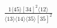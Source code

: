 \documentclass[varwidth, border=5pt]{standalone}
\begin{document}
\begin{my}
$\begin{gathered}
\scriptscriptstyle\frac{1⟨45⟩[34]^2⟨12⟩}{⟨13⟩⟨14⟩⟨35⟩[35]^2}
\end{gathered}$
\end{my}
\end{document}
